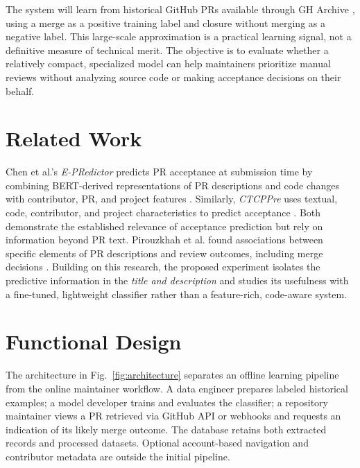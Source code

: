 \documentclass[conference,a4paper,flushend]{cs-techrep}
\begin{document}
The system will learn from historical GitHub PRs available through GH Archive \cite{gharchive}, using a merge as a positive training label and closure without merging as a negative label. This large-scale approximation is a practical learning signal, not a definitive measure of technical merit. The objective is to evaluate whether a relatively compact, specialized model can help maintainers prioritize manual reviews without analyzing source code or making acceptance decisions on their behalf.

\section{Related Work}
Chen et al.'s \emph{E-PRedictor} predicts PR acceptance at submission time by combining BERT-derived representations of PR descriptions and code changes with contributor, PR, and project features \cite{chen2025epredictor}. Similarly, \emph{CTCPPre} uses textual, code, contributor, and project characteristics to predict acceptance \cite{jiang2020ctcppre}. Both demonstrate the established relevance of acceptance prediction but rely on information beyond PR text. Pirouzkhah et al. found associations between specific elements of PR descriptions and review outcomes, including merge decisions \cite{pirouzkhah2026descriptions}. Building on this research, the proposed experiment isolates the predictive information in the \emph{title and description} and studies its usefulness with a fine-tuned, lightweight classifier rather than a feature-rich, code-aware system.

\section{Functional Design}
The architecture in Fig.~\ref{fig:architecture} separates an offline learning pipeline from the online maintainer workflow. A data engineer prepares labeled historical examples; a model developer trains and evaluates the classifier; a repository maintainer views a PR retrieved via GitHub API or webhooks \cite{githubpullapi} and requests an indication of its likely merge outcome. The database retains both extracted records and processed datasets. Optional account-based navigation and contributor metadata are outside the initial pipeline.
\end{document}
